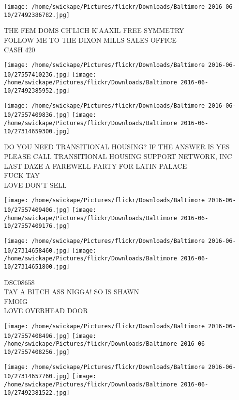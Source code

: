 \documentclass[10pt,letterpaper]{article}
\begin{document}
\vspace{0.25in}
\texttt{[image: /home/swickape/Pictures/flickr/Downloads/Baltimore 2016-06-10/27492386782.jpg]}

THE FEM DOMS CH'LICH K'AAXIL FREE SYMMETRY\\
FOLLOW ME TO THE DIXON MILLS SALES OFFICE\\
CASH 420
\pagebreak

\texttt{[image: /home/swickape/Pictures/flickr/Downloads/Baltimore 2016-06-10/27557410236.jpg]}
\texttt{[image: /home/swickape/Pictures/flickr/Downloads/Baltimore 2016-06-10/27492385952.jpg]}

\texttt{[image: /home/swickape/Pictures/flickr/Downloads/Baltimore 2016-06-10/27557409836.jpg]}
\texttt{[image: /home/swickape/Pictures/flickr/Downloads/Baltimore 2016-06-10/27314659300.jpg]}

DO YOU NEED TRANSITIONAL HOUSING?  IF THE ANSWER IS YES PLEASE CALL TRANSITIONAL HOUSING SUPPORT NETWORK, INC\\
LAST DAZE A FAREWELL PARTY FOR LATIN PALACE\\
FUCK TAY\\
LOVE DON'T SELL
\pagebreak

\texttt{[image: /home/swickape/Pictures/flickr/Downloads/Baltimore 2016-06-10/27557409406.jpg]}
\texttt{[image: /home/swickape/Pictures/flickr/Downloads/Baltimore 2016-06-10/27557409176.jpg]}

\texttt{[image: /home/swickape/Pictures/flickr/Downloads/Baltimore 2016-06-10/27314658460.jpg]}
\texttt{[image: /home/swickape/Pictures/flickr/Downloads/Baltimore 2016-06-10/27314651800.jpg]}

DSC08658\\
TAY A BITCH ASS NIGGA!  SO IS SHAWN\\
FMOIG\\
LOVE OVERHEAD DOOR
\pagebreak

\texttt{[image: /home/swickape/Pictures/flickr/Downloads/Baltimore 2016-06-10/27557408496.jpg]}
\texttt{[image: /home/swickape/Pictures/flickr/Downloads/Baltimore 2016-06-10/27557408256.jpg]}

\texttt{[image: /home/swickape/Pictures/flickr/Downloads/Baltimore 2016-06-10/27314657760.jpg]}
\texttt{[image: /home/swickape/Pictures/flickr/Downloads/Baltimore 2016-06-10/27492381522.jpg]}
\end{document}
